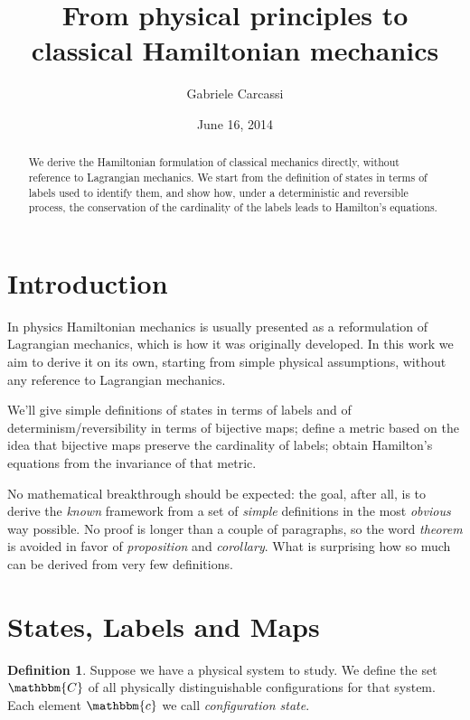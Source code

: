 \documentclass[aps,pra,10pt,twocolumn,floatfix,nofootinbib]{revtex4-1}
\theoremstyle{definition}
\newtheorem{defn}[thm]{Definition}
\begin{document}
\title{From physical principles to classical Hamiltonian mechanics}
\author{Gabriele Carcassi}
\date{June 16, 2014}

\begin{abstract}
We derive the Hamiltonian formulation of classical mechanics directly, without reference to Lagrangian mechanics.
We start from the definition of states in terms of labels used to identify them, and show how, under a deterministic and
reversible process, the conservation of the cardinality of the labels leads to Hamilton's equations.\end{abstract}

\maketitle

\section{Introduction}
In physics Hamiltonian mechanics is usually presented as a reformulation of Lagrangian mechanics, which is how it was originally developed. In this work we aim to derive it on its own, starting from simple physical assumptions, without any reference to Lagrangian mechanics.

We'll give simple definitions of states in terms of labels and of determinism/reversibility in terms of bijective maps; define a metric based on the idea that bijective maps preserve the cardinality of labels; obtain Hamilton's equations from the invariance of that metric.

No mathematical breakthrough should be expected: the goal, after all, is to derive the \emph{known} framework from a set of \emph{simple} definitions in the most \emph{obvious} way possible. No proof is longer than a couple of paragraphs, so the word \emph{theorem} is avoided in favor of \emph{proposition} and \emph{corollary}. What is surprising how so much can be derived from very few definitions.

\section{States, Labels and Maps}

\begin{defn}\label{statedef}
Suppose we have a physical system to study. We define the set $\mathbbm{C}$ of all physically distinguishable configurations for that system. Each element $\mathbbm{c}$ we call \emph{configuration state}.
\end{defn}
\end{document}
